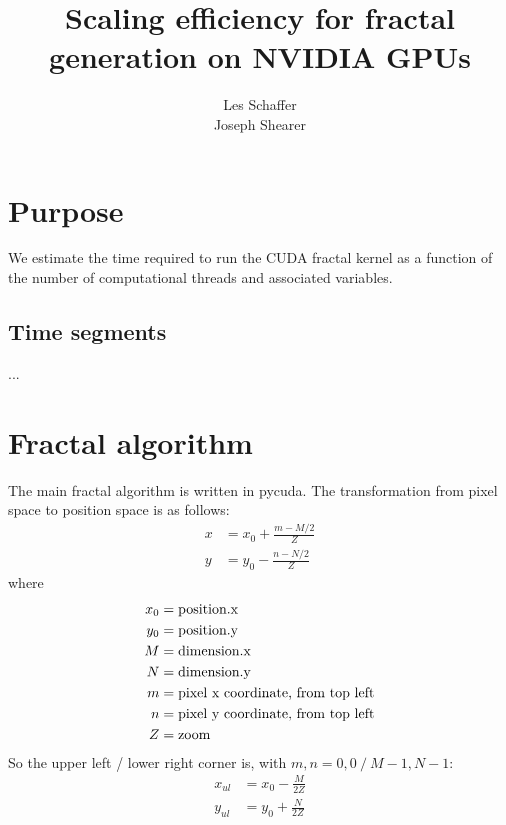 \documentclass[10pt]{article} %
\title{Scaling efficiency for fractal generation on NVIDIA GPUs}
\author{Les Schaffer\\Joseph Shearer}
\date{} %
\begin{document}
\maketitle

\section{Purpose}

We estimate the time required to run the CUDA fractal kernel as a function of the number of computational threads and associated variables.

\subsection{Time segments}

...

\section{Fractal algorithm}
The main fractal algorithm is written in pycuda. The transformation from pixel space to position space is as follows:
\begin{align}
x &= x_0 + \frac{m-M/2}{Z}  \\
y &= y_0 - \frac{n-N/2}{Z}
\end{align}
where
\begin{align*}
x_0 &= \hbox{\rm position.x}\\
y_0 &= \hbox{\rm position.y}\\
M &= \hbox{\rm dimension.x}\\
N &= \hbox{\rm dimension.y}\\
m &= \hbox{\rm pixel x coordinate, from top left}\\
n &= \hbox{\rm pixel y coordinate, from top left}\\
Z &= \hbox{\rm zoom}
\end{align*}
So the upper left / lower right corner is, with $m,n=0,0\ /\ M-1, N-1$:
\begin{align}
x_{ul} &= x_0 - \frac{M}{2Z}  \\
y_{ul} &= y_0 + \frac{N}{2Z}
\end{align}
\end{document}
